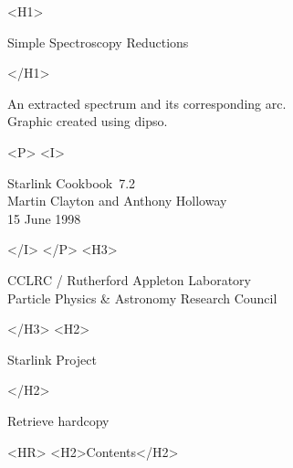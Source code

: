 \documentclass[twoside,11pt]{article}
\newcommand{\stardoccategory}  {Starlink Cookbook}
\newcommand{\stardocsource}    {sc\stardocnumber}
\newcommand{\stardocnumber}    {7.2}
\newcommand{\stardocauthors}   {Martin Clayton and Anthony Holloway}
\newcommand{\stardocdate}      {15 June 1998}
\newcommand{\stardoctitle}     {Simple Spectroscopy Reductions}
\newcommand{\htmladdnormallink}[2]{#1}
\newcommand{\htmladdimg}[1]{}
\newcommand{\htmlref}[2]{#1}
\newcommand{\htmladdtonavigation}[1]{}
\newcommand{\xref}[3]{#1}
\newcommand{\xlabel}[1]{}
\newcommand{\latexonlytoc}[0]{\tableofcontents}
\begin{document}
\begin{htmlonly}
   \xlabel{}
   \begin{rawhtml} <H1> \end{rawhtml}
      \stardoctitle\\
   \begin{rawhtml} </H1> \end{rawhtml}

   \begin{figure}[h]
   \epsfysize=100mm
   \end{figure}

   An extracted spectrum and its corresponding arc.\\
   Graphic created using \xref{{\sc dipso}}{sun50}{}\cite{dipso}.

   \begin{rawhtml} <P> <I> \end{rawhtml}
   \stardoccategory\ \stardocnumber \\
   \stardocauthors \\
   \stardocdate
   \begin{rawhtml} </I> </P> <H3> \end{rawhtml}
      \htmladdnormallink{CCLRC}{http://www.cclrc.ac.uk} /
      \htmladdnormallink{Rutherford Appleton Laboratory}
                        {http://www.cclrc.ac.uk/ral} \\
      \htmladdnormallink{Particle Physics \& Astronomy Research Council}
                        {http://www.pparc.ac.uk} \\
   \begin{rawhtml} </H3> <H2> \end{rawhtml}
      \htmladdnormallink{Starlink Project}{http://star-www.rl.ac.uk/}
   \begin{rawhtml} </H2> \end{rawhtml}
   \htmladdnormallink{\htmladdimg{source.gif} Retrieve hardcopy}
      {http://star-www.rl.ac.uk/cgi-bin/hcserver?\stardocsource}\\

  \label{stardoccontents}
  \begin{rawhtml}
    <HR>
    <H2>Contents</H2>
  \end{rawhtml}
  \newcommand{\latexonlytoc}[0]{}
  \htmladdtonavigation{\htmlref{\htmladdimg{contents_motif.gif}}
        {stardoccontents}}


\end{htmlonly}
\end{document}
